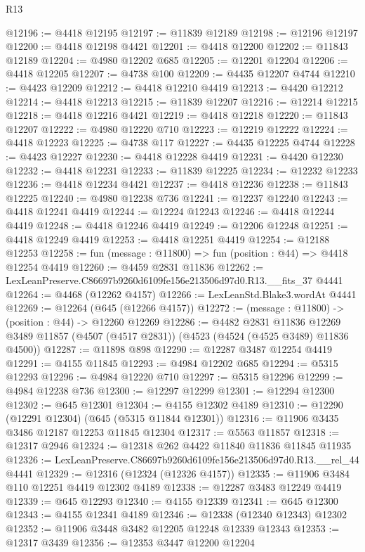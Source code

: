 \begin{lexlean}{R13}
\begin{coremodule}
@12196 := @4418 @12195
@12197 := @11839 @12189
@12198 := @12196 @12197
@12200 := @4418 @12198 @4421
@12201 := @4418 @12200
@12202 := @11843 @12189
@12204 := @4980 @12202 @685
@12205 := @12201 @12204
@12206 := @4418 @12205
@12207 := @4738 @100
@12209 := @4435 @12207 @4744
@12210 := @4423 @12209
@12212 := @4418 @12210 @4419
@12213 := @4420 @12212
@12214 := @4418 @12213
@12215 := @11839 @12207
@12216 := @12214 @12215
@12218 := @4418 @12216 @4421
@12219 := @4418 @12218
@12220 := @11843 @12207
@12222 := @4980 @12220 @710
@12223 := @12219 @12222
@12224 := @4418 @12223
@12225 := @4738 @117
@12227 := @4435 @12225 @4744
@12228 := @4423 @12227
@12230 := @4418 @12228 @4419
@12231 := @4420 @12230
@12232 := @4418 @12231
@12233 := @11839 @12225
@12234 := @12232 @12233
@12236 := @4418 @12234 @4421
@12237 := @4418 @12236
@12238 := @11843 @12225
@12240 := @4980 @12238 @736
@12241 := @12237 @12240
@12243 := @4418 @12241 @4419
@12244 := @12224 @12243
@12246 := @4418 @12244 @4419
@12248 := @4418 @12246 @4419
@12249 := @12206 @12248
@12251 := @4418 @12249 @4419
@12253 := @4418 @12251 @4419
@12254 := @12188 @12253
@12258 := fun (message : @11800) => fun (position : @44) => @4418 @12254 @4419
@12260 := @4459 @2831 @11836
@12262 := LexLeanPreserve.C86697b9260d6109fe156e213506d97d0.R13.__fits_37 @4441
@12264 := @4468 (@12262 @4157)
@12266 := LexLeanStd.Blake3.wordAt @4441
@12269 := @12264 (@645 (@12266 @4157))
@12272 := (message : @11800) -> (position : @44) -> @12260 @12269
@12286 := @4482
    @2831
    @11836
    @12269
    @3489
    @11857
    (@4507 (@4517 @2831))
    (@4523 (@4524 (@4525 @3489) @11836 @4500))
@12287 := @11898 @898
@12290 := @12287 @3487 @12254 @4419
@12291 := @4155 @11845
@12293 := @4984 @12202 @685
@12294 := @5315 @12293
@12296 := @4984 @12220 @710
@12297 := @5315 @12296
@12299 := @4984 @12238 @736
@12300 := @12297 @12299
@12301 := @12294 @12300
@12302 := @645 @12301
@12304 := @4155 @12302 @4189
@12310 := @12290 (@12291 @12304) (@645 (@5315 @11844 @12301))
@12316 := @11906 @3435 @3486 @12187 @12253 @11845 @12304
@12317 := @5563 @11857
@12318 := @12317 @2946
@12324 := @12318 @262 @4422 @11840 @11836 @11845 @11935
@12326 := LexLeanPreserve.C86697b9260d6109fe156e213506d97d0.R13.__rel_44 @4441
@12329 := @12316 (@12324 (@12326 @4157))
@12335 := @11906 @3484 @110 @12251 @4419 @12302 @4189
@12338 := @12287 @3483 @12249 @4419
@12339 := @645 @12293
@12340 := @4155 @12339
@12341 := @645 @12300
@12343 := @4155 @12341 @4189
@12346 := @12338 (@12340 @12343) @12302
@12352 := @11906 @3448 @3482 @12205 @12248 @12339 @12343
@12353 := @12317 @3439
@12356 := @12353 @3447 @12200 @12204

\end{coremodule}
\end{lexlean}

